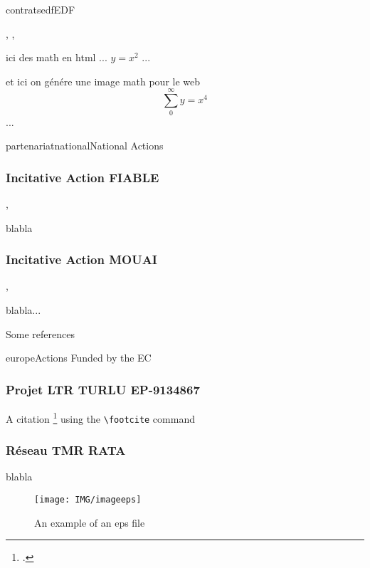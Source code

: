 \documentclass{ra2013}
\begin{document}
\begin{module}{contrats}{edf}{EDF}
\begin{participants}
, 
,
\end{participants}
ici des math en html 
... $y=x^2$ ...

et ici on génére une image math pour le web  
\begin{displaymath}
\sum_{0}^{\infty} y = x^4
\end{displaymath}
...

\end{module}



\begin{module}{partenariat}{national}{National Actions}

\subsubsection{Incitative Action  FIABLE}
\begin{participants}
,
\end{participants}

blabla

\subsubsection{Incitative Action  MOUAI}
\begin{participants}
, 
\end{participants}

blabla...

Some references 

\end{module}


\begin{module}{}{europe}{Actions Funded by the EC}
\subsubsection{Projet LTR TURLU EP-9134867}
A citation \footcite{MB07} using the \verb=\footcite= command
\subsubsection{Réseau TMR RATA}
blabla

\begin{figure}
\begin{center}
\texttt{[image: IMG/imageeps]}
\end{center}
\caption{An example of an eps file}
\label{fig:completemap}
\end{figure}


\end{module}
\end{document}
